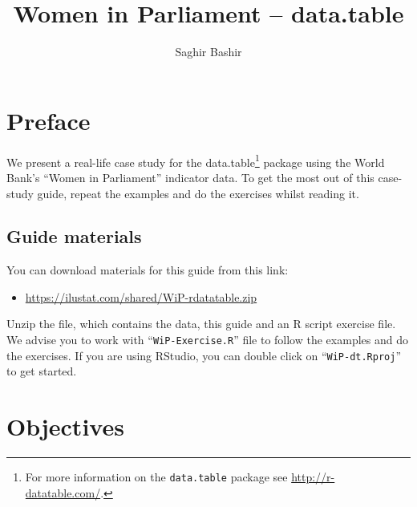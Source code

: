 \documentclass[a4paper,9pt,twocolumn,twoside,printwatermark=false]{pinp}
\title{Women in Parliament -- data.table}
\author[]{Saghir Bashir}
\providecommand{\tightlist}{%
  \setlength{\itemsep}{0pt}\setlength{\parskip}{0pt}}
\begin{document}
\verticaladjustment{-2pt}

\maketitle
\thispagestyle{firststyle}



\section{Preface}\label{preface}

We present a real-life case study for the data.table\footnote{For more
  information on the \texttt{data.table} package see
  \url{http://r-datatable.com/}.} package using the World Bank's ``Women
in Parliament'' indicator data. To get the most out of this case-study
guide, repeat the examples and do the exercises whilst reading it.

\subsection{Guide materials}\label{guide-materials}

You can download materials for this guide from this link:

\begin{itemize}
\tightlist
\item
  \url{https://ilustat.com/shared/WiP-rdatatable.zip}
\end{itemize}

Unzip the file, which contains the data, this guide and an R script
exercise file. We advise you to work with ``\texttt{WiP-Exercise.R}''
file to follow the examples and do the exercises. If you are using
RStudio, you can double click on ``\texttt{WiP-dt.Rproj}'' to get
started.

\section{Objectives}\label{objectives}
\end{document}
